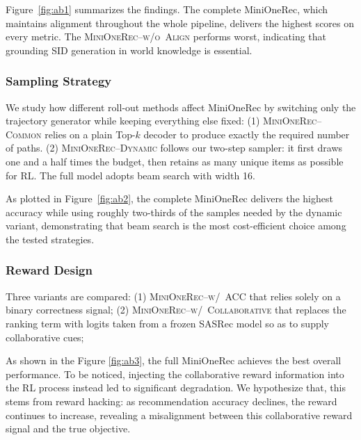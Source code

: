 Figure~\ref{fig:ab1} summarizes the findings. The complete MiniOneRec, which maintains alignment throughout the whole pipeline, delivers the highest scores on every metric. The \textsc{MiniOneRec}--\textsc{w/o~Align} performs worst, indicating that grounding SID generation in world knowledge is essential.

\subsubsection{Sampling Strategy}

We study how different roll-out methods affect MiniOneRec by switching only the trajectory generator while keeping everything else fixed:  
(1) \textsc{MiniOneRec}--\textsc{Common} relies on a plain Top-$k$ decoder to produce exactly the required number of paths.  
(2) \textsc{MiniOneRec}--\textsc{Dynamic} follows our two-step sampler: it first draws one and a half times the budget, then retains as many unique items as possible for RL.  
The full model adopts beam search with width 16.

As plotted in Figure~\ref{fig:ab2}, the complete MiniOneRec delivers the highest accuracy while using roughly two-thirds of the samples needed by the dynamic variant, demonstrating that beam search is the most cost-efficient choice among the tested strategies.

\subsubsection{Reward Design}

Three variants are compared:
(1) \textsc{MiniOneRec}--\textsc{w/~ACC} that relies solely on a binary correctness signal;  
(2) \textsc{MiniOneRec}--\textsc{w/~Collaborative} that replaces the ranking term with logits taken from a frozen SASRec model so as to supply collaborative cues;  

As shown in the Figure \ref{fig:ab3}, the full MiniOneRec achieves the best overall performance. To be noticed, injecting the collaborative reward information into the RL process instead led to significant degradation. We hypothesize that, this stems from reward hacking: as recommendation accuracy declines, the reward continues to increase, revealing a misalignment between this collaborative reward signal and the true objective.

